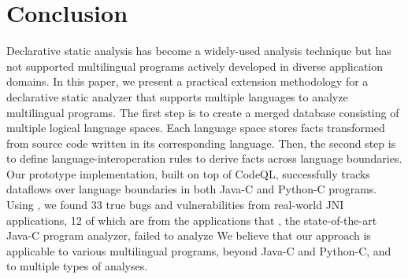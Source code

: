 \section{Conclusion}\label{sec:conclude}
Declarative static analysis has become a widely-used analysis technique but
has not supported multilingual programs actively developed in diverse
application domains.
In this paper, we present a practical extension methodology for a declarative static
analyzer that supports multiple languages to analyze multilingual programs.
The first step is to create a merged database consisting of multiple logical language
spaces. Each language space stores facts transformed from source code written in its
corresponding language.
Then, the second step is to define language-interoperation rules to derive facts
across language boundaries.
Our prototype implementation, \ours built on top of CodeQL, successfully tracks dataflows
over language boundaries in both Java-C and Python-C programs.
Using \ours, we found 33 true bugs and vulnerabilities from real-world
JNI applications, 12 of which are from the applications that \lees,
the state-of-the-art Java-C program analyzer, failed to analyze 
We believe that our approach is applicable to various multilingual programs,
beyond Java-C and Python-C, and to multiple types of analyses.

